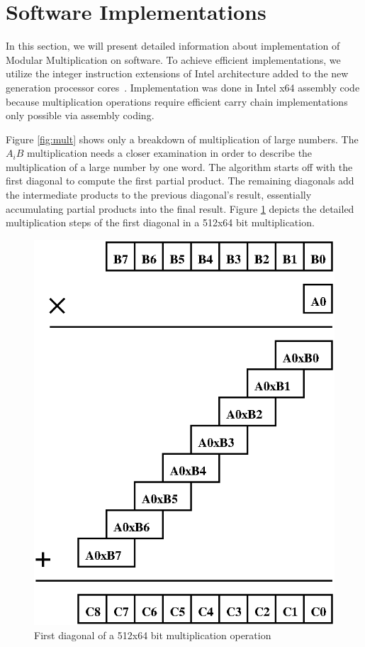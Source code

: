 \documentclass[twocolumn]{svjour3}          %
\begin{document}
\section{Software Implementations}
\label{sec:softimp}

In this section, we will present detailed information about implementation of Modular Multiplication on software. To achieve efficient implementations, we utilize the integer instruction extensions of Intel architecture added to the new generation processor cores~\cite{largeint}. Implementation was done in Intel x64 assembly code because multiplication operations require efficient carry chain implementations only possible via assembly coding.

Figure \ref{fig:mult} shows only a breakdown of multiplication of large numbers. The $A_iB$ multiplication needs a closer examination in order to describe the multiplication of a large number by one word.
%
The algorithm starts off with the first diagonal to compute the first partial product.
The remaining diagonals add the intermediate products to the previous diagonal's result, essentially accumulating
partial products into the final result.
%
Figure \ref{fig:diag0} depicts the detailed multiplication steps of the first diagonal in a 512x64 bit multiplication.

\begin{figure}[ht]
\centering
  \includegraphics[scale=0.7]{multdiag0.eps}
\caption{First diagonal of a 512x64 bit multiplication operation}
\label{fig:diag0}
\end{figure}
\end{document}
